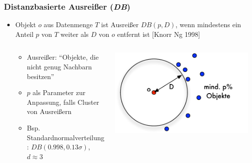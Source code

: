    \begin{frame}
    \frametitle{Distanzbasierte Ausreißer (\emph{DB})}
    
    \begin{itemize}
    \item Objekt $o$ aus Datenmenge $T$ ist Ausreißer $DB(p,D)$, wenn
      mindestens ein Anteil $p$ von $T$ weiter als $D$ von $o$ entfernt
      ist [Knorr Ng 1998] 
    \begin{columns}[c]
    \begin{column}{5cm}
    \begin{itemize}
    \item Ausreißer: "`Objekte, die nicht genug Nachbarn besitzen"'
    \item $p$ als Parameter zur Anpassung, falls Cluster von Ausreißern
    \item Bsp. Standardnormalverteilung: $DB(0.998, 0.13\sigma)$, $d \approx 3$
    \end{itemize}
    \end{column}
    \begin{column}{5cm}
    \includegraphics[scale=.6]{fig4/distance-outlier.pdf}
    \end{column}
    \end{columns}
    
    \end{itemize}
    
    
    \end{frame}
    
    
    
